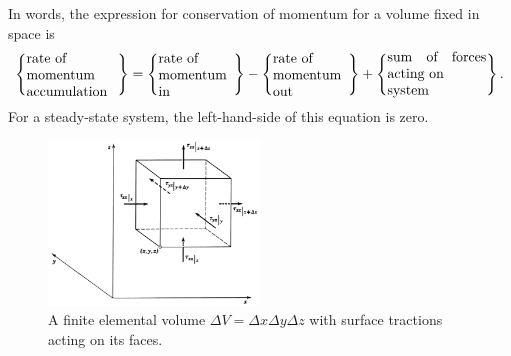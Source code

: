 \documentclass[a4paper,11pt]		{report}
\begin{document}
In words, the expression for conservation of momentum for a volume
fixed in space is
\begin{equation}
\left\{ \parbox{23mm}{rate of\\ momentum\\ accumulation} \right\}=
\left\{ \parbox{19mm}{rate of\\ momentum\\ in} \right\}-
\left\{ \parbox{19mm}{rate of\\ momentum\\ out} \right\}+
\left\{ \parbox{25mm}{sum of forces acting on\\ system} \right\}.
\label{eq.mom_bal_words}
\end{equation}
For a steady-state system, the left-hand-side of this equation is
zero.

\begin{figure}
\begin{center}
\includegraphics[width=0.5\textwidth]{BSL-3.1-2.eps}
\end{center}
\caption{A finite elemental volume $\Delta V=\Delta x\Delta y\Delta z$
with surface tractions acting on its faces.}
\label{fig.momV}
\end{figure}
\end{document}
